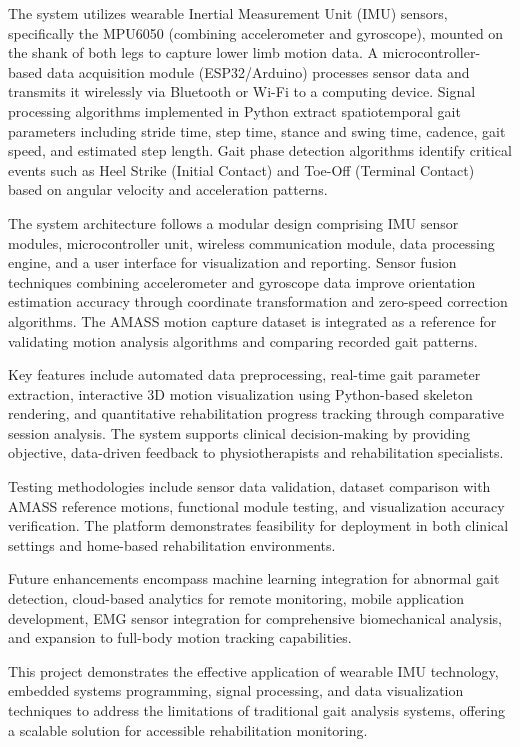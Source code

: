 \documentclass[12pt,a4paper]{report}
\begin{document}
The system utilizes wearable Inertial Measurement Unit (IMU) sensors, specifically the MPU6050 (combining accelerometer and gyroscope), mounted on the shank of both legs to capture lower limb motion data. A microcontroller-based data acquisition module (ESP32/Arduino) processes sensor data and transmits it wirelessly via Bluetooth or Wi-Fi to a computing device. Signal processing algorithms implemented in Python extract spatiotemporal gait parameters including stride time, step time, stance and swing time, cadence, gait speed, and estimated step length. Gait phase detection algorithms identify critical events such as Heel Strike (Initial Contact) and Toe-Off (Terminal Contact) based on angular velocity and acceleration patterns.

The system architecture follows a modular design comprising IMU sensor modules, microcontroller unit, wireless communication module, data processing engine, and a user interface for visualization and reporting. Sensor fusion techniques combining accelerometer and gyroscope data improve orientation estimation accuracy through coordinate transformation and zero-speed correction algorithms. The AMASS motion capture dataset is integrated as a reference for validating motion analysis algorithms and comparing recorded gait patterns.

Key features include automated data preprocessing, real-time gait parameter extraction, interactive 3D motion visualization using Python-based skeleton rendering, and quantitative rehabilitation progress tracking through comparative session analysis. The system supports clinical decision-making by providing objective, data-driven feedback to physiotherapists and rehabilitation specialists.

Testing methodologies include sensor data validation, dataset comparison with AMASS reference motions, functional module testing, and visualization accuracy verification. The platform demonstrates feasibility for deployment in both clinical settings and home-based rehabilitation environments.

Future enhancements encompass machine learning integration for abnormal gait detection, cloud-based analytics for remote monitoring, mobile application development, EMG sensor integration for comprehensive biomechanical analysis, and expansion to full-body motion tracking capabilities.

This project demonstrates the effective application of wearable IMU technology, embedded systems programming, signal processing, and data visualization techniques to address the limitations of traditional gait analysis systems, offering a scalable solution for accessible rehabilitation monitoring.
\end{document}
